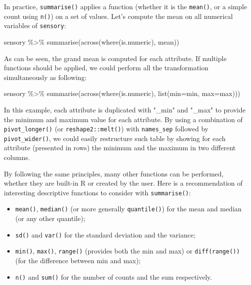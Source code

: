 \documentclass[
]{book}
\newenvironment{Shaded}{\begin{snugshade}}{\end{snugshade}}
\newcommand{\AttributeTok}[1]{\textcolor[rgb]{0.77,0.63,0.00}{#1}}
\newcommand{\FunctionTok}[1]{\textcolor[rgb]{0.00,0.00,0.00}{#1}}
\newcommand{\NormalTok}[1]{#1}
\newcommand{\SpecialCharTok}[1]{\textcolor[rgb]{0.00,0.00,0.00}{#1}}
\providecommand{\tightlist}{%
  \setlength{\itemsep}{0pt}\setlength{\parskip}{0pt}}
\begin{document}
In practice, \texttt{summarise()} applies a function (whether it is the \texttt{mean()}, or a simple count using \texttt{n()}) on a set of values. Let's compute the mean on all numerical variables of \texttt{sensory}:

\begin{Shaded}
\begin{Highlighting}[]
\NormalTok{sensory }\SpecialCharTok{\%\textgreater{}\%} 
  \FunctionTok{summarise}\NormalTok{(}\FunctionTok{across}\NormalTok{(}\FunctionTok{where}\NormalTok{(is.numeric), mean))}
\end{Highlighting}
\end{Shaded}

As can be seen, the grand mean is computed for each attribute.
If multiple functions should be applied, we could perform all the transformation simultaneously as following:

\begin{Shaded}
\begin{Highlighting}[]
\NormalTok{sensory }\SpecialCharTok{\%\textgreater{}\%} 
  \FunctionTok{summarise}\NormalTok{(}\FunctionTok{across}\NormalTok{(}\FunctionTok{where}\NormalTok{(is.numeric), }\FunctionTok{list}\NormalTok{(}\AttributeTok{min=}\NormalTok{min, }\AttributeTok{max=}\NormalTok{max)))}
\end{Highlighting}
\end{Shaded}

In this example, each attribute is duplicated with "\_min" and "\_max" to provide the minimum and maximum value for each attribute. By using a combination of \texttt{pivot\_longer()} (or \texttt{reshape2::melt()}) with \texttt{names\_sep} followed by \texttt{pivot\_wider()}, we could easily restructure such table by showing for each attribute (presented in rows) the minimum and the maximum in two different columns.

By following the same principles, many other functions can be performed, whether they are built-in R or created by the user.
Here is a recommendation of interesting descriptive functions to consider with \texttt{summarise()}:

\begin{itemize}
\tightlist
\item
  \texttt{mean()}, \texttt{median()} (or more generally \texttt{quantile()}) for the mean and median (or any other quantile);
\item
  \texttt{sd()} and \texttt{var()} for the standard deviation and the variance;
\item
  \texttt{min()}, \texttt{max()}, \texttt{range()} (provides both the min and max) or \texttt{diff(range())} (for the difference between min and max);
\item
  \texttt{n()} and \texttt{sum()} for the number of counts and the sum respectively.
\end{itemize}
\end{document}
